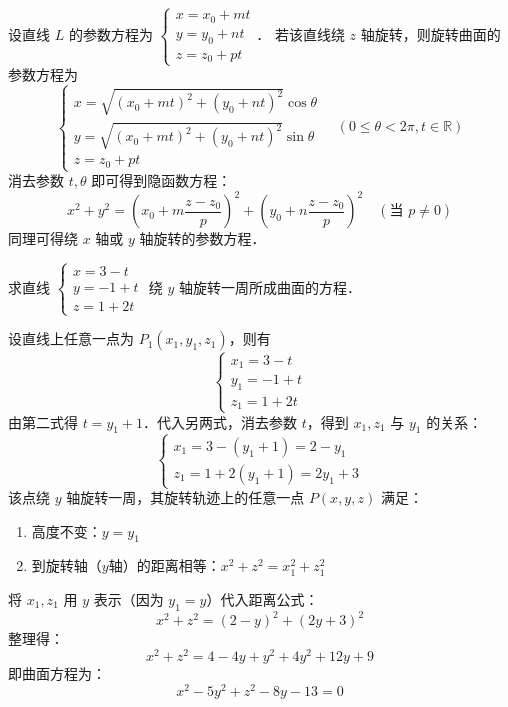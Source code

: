 \documentclass[12pt, a4paper, oneside, UTF8]{ctexbook}
\begin{document}
\begin{corollary}[直线绕坐标轴旋转]
    设直线 $L$ 的参数方程为 $\begin{cases} x = x_0 + mt \\ y = y_0 + nt \\ z = z_0 + pt \end{cases}$．
    若该直线绕 $z$ 轴旋转，则旋转曲面的参数方程为
    \[
        \begin{cases}
            x = \sqrt{(x_0+mt)^2 + (y_0+nt)^2} \cos\theta \\
            y = \sqrt{(x_0+mt)^2 + (y_0+nt)^2} \sin\theta \\
            z = z_0 + pt
        \end{cases} \quad (0 \le \theta < 2\pi, t \in \mathbb{R})
    \]
    消去参数 $t, \theta$ 即可得到隐函数方程：
    \[
        x^2 + y^2 = \left(x_0 + m\frac{z-z_0}{p}\right)^2 + \left(y_0 + n\frac{z-z_0}{p}\right)^2 \quad (\text{当 } p \ne 0)
    \]
    同理可得绕 $x$ 轴或 $y$ 轴旋转的参数方程．
\end{corollary}

\begin{example}
    求直线 $\begin{cases}
        x = 3 - t\\
        y = -1 + t\\
        z = 1 + 2t
        \end{cases}$ 绕 $y$ 轴旋转一周所成曲面的方程．
\end{example}
\begin{solution}
    设直线上任意一点为 $P_1(x_1, y_1, z_1)$，则有
    \[
        \begin{cases}
            x_1 = 3 - t\\
            y_1 = -1 + t\\
            z_1 = 1 + 2t
        \end{cases}
    \]
    由第二式得 $t = y_1 + 1$．代入另两式，消去参数 $t$，得到 $x_1, z_1$ 与 $y_1$ 的关系：
    \[
        \begin{cases}
            x_1 = 3 - (y_1 + 1) = 2 - y_1 \\
            z_1 = 1 + 2(y_1 + 1) = 2y_1 + 3
        \end{cases}
    \]
    该点绕 $y$ 轴旋转一周，其旋转轨迹上的任意一点 $P(x,y,z)$ 满足：
    \begin{enumerate}
        \item 高度不变：$y = y_1$
        \item 到旋转轴（$y$轴）的距离相等：$x^2 + z^2 = x_1^2 + z_1^2$
    \end{enumerate}
    将 $x_1, z_1$ 用 $y$ 表示（因为 $y_1=y$）代入距离公式：
    \[
        x^2 + z^2 = (2 - y)^2 + (2y + 3)^2
    \]
    整理得：
    \[
        x^2 + z^2 = 4 - 4y + y^2 + 4y^2 + 12y + 9
    \]
    即曲面方程为：
    \[
        \boxed{x^2 - 5y^2 + z^2 - 8y - 13 = 0}
    \]
\end{solution}
\end{document}
